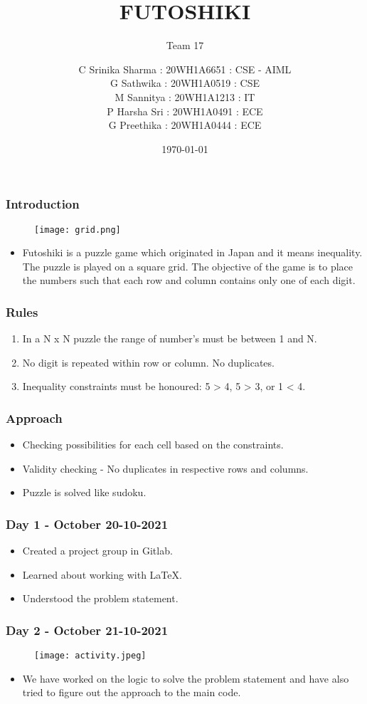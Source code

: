 \documentclass[14pt]{beamer}
\title{FUTOSHIKI}
\subtitle{Team 17}
\date{\today}
\author[Bvrith]{ C Srinika Sharma : 20WH1A6651 : CSE - AIML\\G Sathwika : 20WH1A0519 : CSE\\M Sannitya : 20WH1A1213 : IT \\P Harsha Sri : 20WH1A0491 : ECE\\G Preethika : 20WH1A0444 : ECE}
\begin{document}
   \begin{frame}
        \titlepage
    \end{frame}
   \begin{frame}
	\frametitle{Introduction}
        \begin{figure}
            \texttt{[image: grid.png]}
        \end{figure}
        \begin{itemize}
	    \item Futoshiki is a puzzle game which originated in Japan and it means inequality. The puzzle is played on a square grid. The objective of the game is to place the numbers such that each row and column contains only one of each digit.
	\end{itemize}
   \end{frame}
   \begin{frame}
	\frametitle{Rules}
         \begin{enumerate}
	    \item In a N x N puzzle the range of number's must be between 1 and N.  
	    \item No digit is repeated within row or column. No duplicates. 
	    \item Inequality constraints must be honoured: 5 > 4, 5 > 3, or 1 < 4.
	\end{enumerate}
  \end{frame}
\begin{frame}
   \frametitle{Approach}
   \begin{itemize}
       \item Checking possibilities for each cell based on the constraints.
       \item Validity checking - No duplicates in respective rows and columns.
       \item Puzzle is solved like sudoku.
   \end{itemize}
\end{frame}
 \begin{frame}
      \frametitle {Day 1 - October 20-10-2021}
     \begin{itemize}
          \item Created a project group in Gitlab.
          \item Learned about working with LaTeX.
          \item Understood the problem statement.
     \end{itemize}
\end{frame}
   \begin{frame}
	\frametitle{Day 2 - October 21-10-2021}
       \begin{figure}
            \texttt{[image: activity.jpeg]}
       \end{figure}
         \begin{itemize}
	    \item We have worked on the logic to solve the problem statement and have also tried to figure out the approach to the main code. 
	\end{itemize}
  \end{frame}
\end{document}
